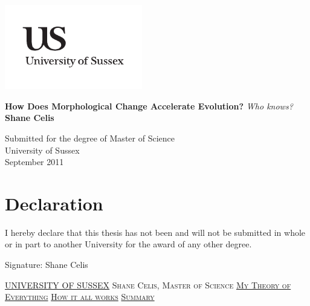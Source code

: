 \documentclass[a4paper,11pt]{report}
\newcommand{\linespacing}{1.5}
\renewcommand{\baselinestretch}{\linespacing}
\begin{document}




\thispagestyle{empty}
\begin{flushright}
\includegraphics[width=6cm]{fig/uslogo.pdf}
\end{flushright}	
\vskip40mm
\begin{center}
\huge\textbf{How Does Morphological Change Accelerate Evolution?}
\vskip2mm
\LARGE\textit{Who knows?}
\vskip5mm
\Large\textbf{Shane Celis}
\normalsize
\end{center}
\vfill
\begin{flushleft}
\large
Submitted for the degree of Master of Science \\
University of Sussex	\\
September 2011
\end{flushleft}		


\chapter*{Declaration}
I hereby declare that this thesis has not been and will not be submitted in whole or in part to another University for the award of any other degree.
	

\vskip5mm
Signature:
\vskip20mm
Shane Celis


\thispagestyle{empty}
\newpage
\null\vskip10mm
\begin{center}
\large
\underline{UNIVERSITY OF SUSSEX}
\vskip20mm
\textsc{Shane Celis, Master of Science}
\vskip20mm
\underline{\textsc{My Theory of Everything}}
\vskip0mm
\underline{\textsc{How it all works}}
\vskip20mm
\underline{\textsc{Summary}}
\vskip2mm
\end{center}
\renewcommand{\baselinestretch}{1.0}
\small\normalsize
\end{document}
